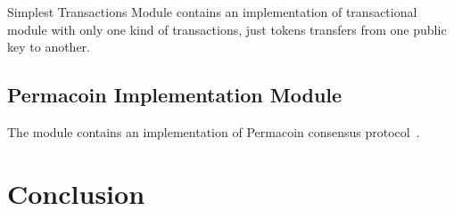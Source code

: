 \documentclass[]{report}   %
\begin{document}
Simplest Transactions Module contains an implementation of transactional module with only one kind of transactions, just tokens transfers from one public key to another.

\subsection{Permacoin Implementation Module}

The module contains an implementation of Permacoin consensus protocol~\cite{miller2014permacoin}.

\section{Conclusion}



\end{document}
